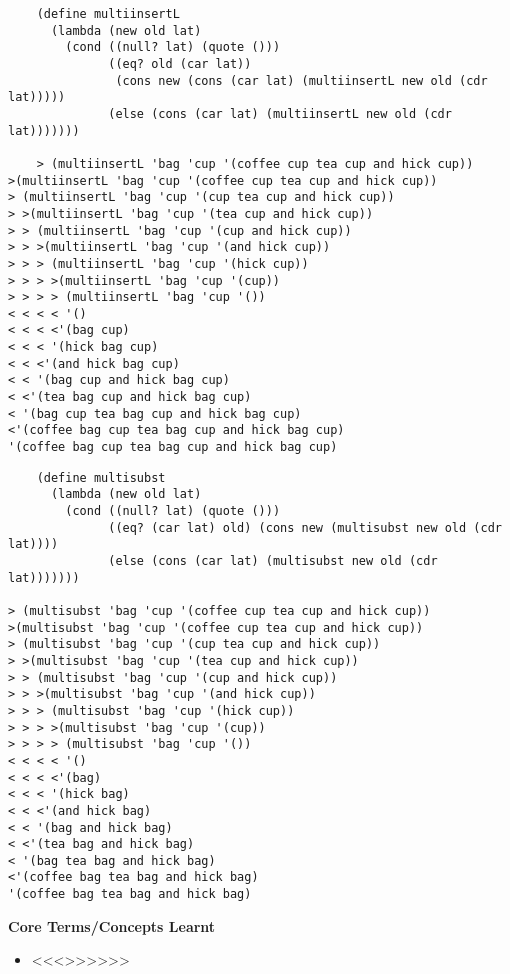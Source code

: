 \documentclass[11pt]{article}
\begin{document}
\begin{itemize}
\begin{verbatim}
    (define multiinsertL
      (lambda (new old lat)
        (cond ((null? lat) (quote ()))
              ((eq? old (car lat))
               (cons new (cons (car lat) (multiinsertL new old (cdr lat)))))
              (else (cons (car lat) (multiinsertL new old (cdr lat)))))))

    > (multiinsertL 'bag 'cup '(coffee cup tea cup and hick cup))
>(multiinsertL 'bag 'cup '(coffee cup tea cup and hick cup))
> (multiinsertL 'bag 'cup '(cup tea cup and hick cup))
> >(multiinsertL 'bag 'cup '(tea cup and hick cup))
> > (multiinsertL 'bag 'cup '(cup and hick cup))
> > >(multiinsertL 'bag 'cup '(and hick cup))
> > > (multiinsertL 'bag 'cup '(hick cup))
> > > >(multiinsertL 'bag 'cup '(cup))
> > > > (multiinsertL 'bag 'cup '())
< < < < '()
< < < <'(bag cup)
< < < '(hick bag cup)
< < <'(and hick bag cup)
< < '(bag cup and hick bag cup)
< <'(tea bag cup and hick bag cup)
< '(bag cup tea bag cup and hick bag cup)
<'(coffee bag cup tea bag cup and hick bag cup)
'(coffee bag cup tea bag cup and hick bag cup)

\end{verbatim}

\begin{verbatim}
    (define multisubst
      (lambda (new old lat)
        (cond ((null? lat) (quote ()))
              ((eq? (car lat) old) (cons new (multisubst new old (cdr lat))))
              (else (cons (car lat) (multisubst new old (cdr lat)))))))

> (multisubst 'bag 'cup '(coffee cup tea cup and hick cup))
>(multisubst 'bag 'cup '(coffee cup tea cup and hick cup))
> (multisubst 'bag 'cup '(cup tea cup and hick cup))
> >(multisubst 'bag 'cup '(tea cup and hick cup))
> > (multisubst 'bag 'cup '(cup and hick cup))
> > >(multisubst 'bag 'cup '(and hick cup))
> > > (multisubst 'bag 'cup '(hick cup))
> > > >(multisubst 'bag 'cup '(cup))
> > > > (multisubst 'bag 'cup '())
< < < < '()
< < < <'(bag)
< < < '(hick bag)
< < <'(and hick bag)
< < '(bag and hick bag)
< <'(tea bag and hick bag)
< '(bag tea bag and hick bag)
<'(coffee bag tea bag and hick bag)
'(coffee bag tea bag and hick bag)

\end{verbatim}
\end{itemize}

\textbf{Core Terms/Concepts Learnt}
\begin{itemize}
\item <<<>>>>>>
\end{itemize}
\end{document}
